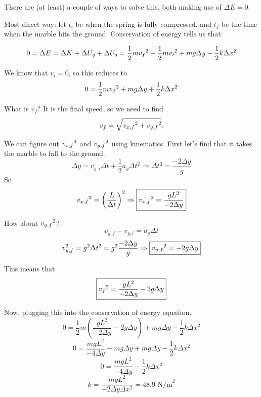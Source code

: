 There are (at least) a couple of ways to solve this, both making use of $\Delta{E}=0$.

Most direct way: let $t_i$ be when the spring is fully compressed, and $t_f$ be the time when the marble hits the ground. Conservation of energy tells us that:

$$0=\Delta{E}=\Delta{K}+\Delta{U_g}+\Delta{U_s}=\frac{1}{2}mv_f\displaystyle^2-\frac{1}{2}mv_i\displaystyle^2+mg\Delta{y}-\frac{1}{2}k\Delta{x}\displaystyle^2$$

We know that $v_i=0$, so this reduces to
$$0=\frac{1}{2}mv_f\displaystyle^2+mg\Delta{y}+\frac{1}{2}k\Delta{x}\displaystyle^2$$

What is $v_f$? It is the final speed, so we need to find
$$v_f=\sqrt{v_{x,f}\displaystyle^2+v_{y,f}\displaystyle^2}.$$

We can figure out $v_{x,f}\displaystyle^2$ and $v_{y,f}\displaystyle^2$ using kinematics. First let's find that it takes the marble to fall to the ground.
$$\Delta{y}=v_{y,i}\Delta{t}+\frac{1}{2}a_y\Delta{t}^2\Rightarrow \boxed{\Delta{t}^2=\frac{-2\Delta{y}}{g}}$$
So
$$v_{x,f}\displaystyle^2=\left(\frac{L}{\Delta{t}}\right)^2\Rightarrow \boxed{v_{x,f}\displaystyle^2=\frac{gL^2}{-2\Delta{y}}}$$

How about $v_{y,f}\displaystyle^2$?
$$v_{y,f}-v_{y,i}=a_y\Delta{t}$$
$$v_{y,f}^2=g^2\Delta{t}^2=g^2\frac{-2\Delta{y}}{g}\Rightarrow \boxed{v_{y,f}\displaystyle^2=-2g\Delta{y}}$$

This means that
$$\boxed{v_f\displaystyle^2=\frac{gL^2}{-2\Delta{y}}-2g\Delta{y}}$$

Now, plugging this into the conservation of energy equation,
$$0=\frac{1}{2}m\left(\frac{gL^2}{-2\Delta{y}}-2g\Delta{y}\right)+mg\Delta{y}-\frac{1}{2}k\Delta{x}^2$$
$$0=\frac{mgL^2}{-4\Delta{y}}-mg\Delta{y}+mg\Delta{y}-\frac{1}{2}k\Delta{x}^2$$
$$0=\frac{mgL^2}{-4\Delta{y}}-\frac{1}{2}k\Delta{x}^2$$
$$k=\frac{mgL^2}{-2\Delta{y}\Delta{x}^2}=\boxed{48.9\mbox{ N/m}^2}$$


\clearpage
